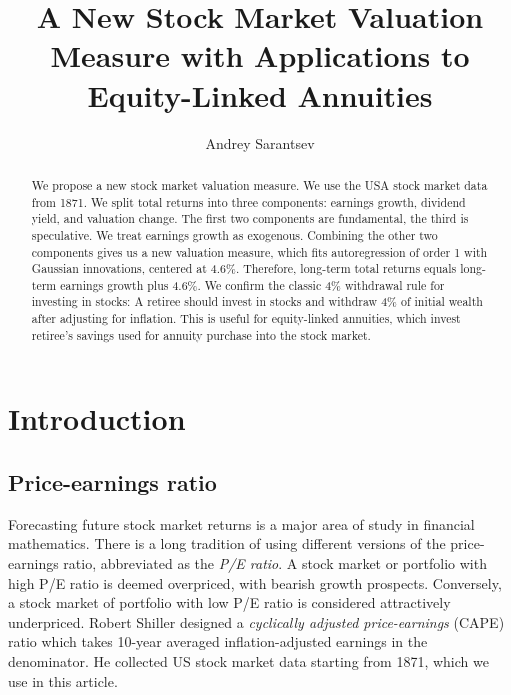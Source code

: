 \documentclass[12pt]{amsart}
\theoremstyle{definition}
\begin{document}
\title[New Valuation Measure Equity-Linked Annuities]{A New Stock Market Valuation Measure with Applications to Equity-Linked Annuities}

\author{Andrey Sarantsev}
\address{University of Nevada in Reno, Department of Mathematics and Statistics}

\begin{abstract} We propose a new stock market valuation measure. We use the USA stock market data from 1871. We split total returns into three components: earnings growth, dividend yield, and valuation change. The first two components are fundamental, the third is speculative. We treat earnings growth as exogenous. Combining the other two components gives us a new valuation measure, which fits autoregression of order 1 with Gaussian innovations, centered at 4.6\%. Therefore, long-term total returns equals long-term earnings growth plus 4.6\%. We confirm the classic 4\% withdrawal rule for investing in stocks: A retiree should invest in stocks and withdraw 4\% of initial wealth after adjusting for inflation. This is useful for equity-linked annuities, which invest retiree's savings used for annuity purchase into the stock market. 
\end{abstract}


\maketitle

\thispagestyle{empty}

\section{Introduction} 

\subsection{Price-earnings ratio} Forecasting future stock market returns is a major area of study in financial mathematics. There is a long tradition of using different versions of the price-earnings ratio, abbreviated as the {\it P/E ratio}. A stock market or portfolio with high P/E ratio is deemed overpriced, with bearish growth prospects. Conversely, a stock market of portfolio with low P/E ratio is considered attractively underpriced. Robert Shiller designed a {\it cyclically adjusted price-earnings} (CAPE) ratio which takes 10-year averaged inflation-adjusted earnings in the denominator. He collected US stock market data starting from 1871, which we use in this article. 
\end{document}
